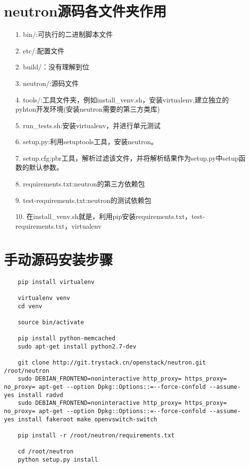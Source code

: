 \documentclass[a4paper,left=1.5cm,right=1.5cm,11pt]{article}
\begin{document}
\tableofcontents

\clearpage

\section{neutron源码各文件夹作用}
    \begin{itemize}
        \item[1.]bin/:可执行的二进制脚本文件
		\item[2.]etc/:配置文件
		\item[2.]build/：没有理解到位
		\item[3.]neutron/:源码文件
		\item[4.]tools/:工具文件夹，例如install_venv.sh，安装virtualenv,建立独立的pyhton开发环境(安装neutron需要的第三方类库)
		\item[5.]run\_tests.sh:安装virtualenv，并进行单元测试
		\item[6.]setup.py:利用setuptools工具，安装neutron。
		\item[7.]setup.cfg:pbr工具，解析过滤该文件，并将解析结果作为setup.py中setup函数的默认参数。
		\item[8.]requirements.txt:neutron的第三方依赖包
		\item[9.]test-requirements.txt:neutron的测试依赖包
		\item[10.]在install_venv.sh就是，利用pip安装requirements.txt，test-requirements.txt，virtualenv
    \end{itemize}

\section{手动源码安装步骤}
	\begin{lstlisting}
	pip install virtualenv
	
	virtualenv venv
	cd venv

	source bin/activate

	pip install python-memcached
	sudo apt-get install python2.7-dev

	git clone http://git.trystack.cn/openstack/neutron.git /root/neutron
	sudo DEBIAN_FRONTEND=noninteractive http_proxy= https_proxy= no_proxy= apt-get --option Dpkg::Options::=--force-confold --assume-yes install radvd
	sudo DEBIAN_FRONTEND=noninteractive http_proxy= https_proxy= no_proxy= apt-get --option Dpkg::Options::=--force-confold --assume-yes install fakeroot make openvswitch-switch

	pip install -r /root/neutron/requirements.txt

	cd /root/neutron
	python setup.py install
	\end{lstlisting}
\end{document}
